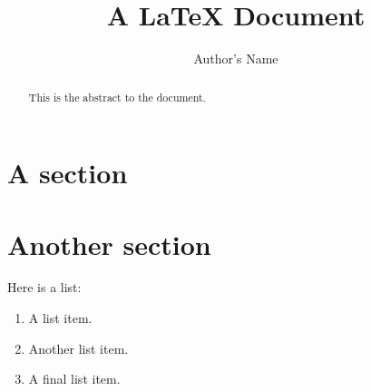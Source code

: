 \documentclass{article}
\title{A \LaTeX{} Document}
\author{Author's Name}
\begin{document}
\maketitle

\begin{abstract}
This is the abstract to the document.
\end{abstract}

\section{A section}

\lipsum[1]

\section{Another section}

Here is a list:

\begin{enumerate}
    \item A list item.
    \item Another list item.
    \item A final list item.
\end{enumerate}

\lipsum[2]
\end{document}
